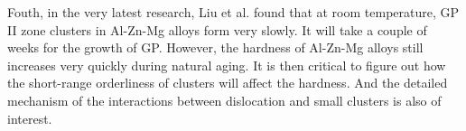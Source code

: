 Fouth, in the very latest research, Liu et al. \cite{liu2020formation} found that at room temperature, \ac{GP} II zone clusters in Al-Zn-Mg alloys form very slowly. It will take a couple of weeks for the growth of \ac{GP}. However, the hardness of Al-Zn-Mg alloys still increases very quickly during natural aging. It is then critical to figure out how the short-range orderliness of clusters will affect the hardness. And the detailed mechanism of the interactions between dislocation and small clusters is also of interest.